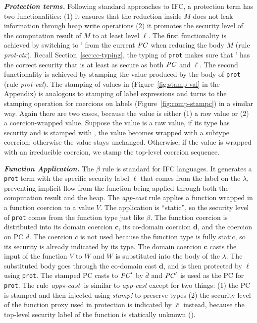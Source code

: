 \textbf{\textit{Protection terms. }}
Following standard approaches to IFC, a protection
term  has two functionalities: (1) it ensures
that the reduction inside $M$ does not leak information through heap
write operations (2) it promotes the security level of the computation
result of $M$ to at least level $\ell$. The first functionality is
achieved by switching to \PC' from the current $\mathit{PC}$ when reducing the
body $M$ (rule \textit{prot-ctx}). Recall Section~\ref{sec:cc-typing},
the typing of \texttt{prot} makes sure that \PC' has the correct
security that is at least as secure as both $\mathit{PC}$ and $\ell$.
The second functionality is achieved by stamping the value produced by
the body of \texttt{prot} (rule \textit{prot-val}).  The stamping of
values in \CC (Figure~\ref{fig:stamp-val} in the Appendix) is analogous to
stamping of label expressions and turns to the stamping operation for
coercions on labels (Figure~\ref{fig:comp-stampc}) in a similar
way. Again there are two cases, because the value is either (1) a raw value or
(2) a coercion-wrapped value. Suppose the value is a raw value, if its type has \low security
and is stamped with \high, the value becomes wrapped with a subtype coercion;
otherwise the value stays unchanged. Otherwise, if the value is wrapped
with an irreducible coercion, we stamp the top-level coercion sequence.

\textbf{\textit{Function Application. }} The $\beta$ rule is standard for IFC languages.
It generates a \texttt{prot} term with the specific security label $\ell$ that
comes from the label on the $\lambda$, preventing implicit
flow from the function being applied through both the computation
result and the heap. The \textit{app-cast} rule applies a function
wrapped in a function coercion to a value $V$. The application is
``static'', so the security level of \texttt{prot} comes from the
function type just like $\beta$. The function coercion is distributed
into its domain coercion $\bm{c}$, its co-domain coercion $\bm{d}$,
and the coercion on PC $\bar{d}$. The coercion $\bar{c}$ is not used
because the function type is fully static, so its security is already
indicated by its type.  The domain coercion $\bm{c}$ casts the input
of the function $V$ to $W$ and $W$ is substituted into the body of the
$\lambda$. The substituted body goes through the co-domain cast
$\bm{d}$, and is then protected by $\ell$ using \texttt{prot}.  The
stamped PC casts to $\mathit{PC}'$ by $\bar{d}$ and $\mathit{PC}'$ is used as the PC
for \texttt{prot}.  The rule $\textit{app}{\star}\textit{-cast}$ is similar
to \textit{app-cast} except for two things: (1) the PC is stamped
and then injected using \textit{stamp!} to preserve types
(2) the security level of the function proxy used in protection is indicated
by $|\bar{c}|$ instead, because the top-level security label of the
function is statically unknown (\unk).

